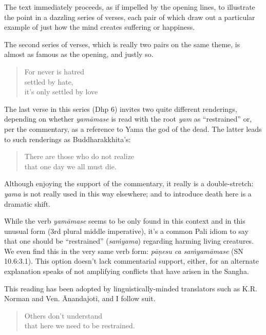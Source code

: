 \documentclass[12pt,openany]{book}%
\begin{document}
The text immediately proceeds, as if impelled by the opening lines, to illustrate the point in a dazzling series of verses, each pair of which draw out a particular example of just how the mind creates suffering or happiness.

The second series of verses, which is really two pairs on the same theme, is almost as famous as the opening, and justly so.

\begin{verse}%
For never is hatred\\

    settled by hate,\\

    it’s only settled by love

%
\end{verse}

The last verse in this series (Dhp 6) invites two quite different renderings, depending on whether \textit{\textsanskrit{yamāmase}} is read with the root \textit{yam} as “restrained” or, per the commentary, as a reference to Yama the god of the dead. The latter leads to such renderings as Buddharakkhita’s:

\begin{verse}%
There are those who do not realize\\

that one day we all must die.

%
\end{verse}

Although enjoying the support of the commentary, it really is a double-stretch: \textit{yama} is not really used in this way elsewhere; and to introduce death here is a dramatic shift.

While the verb \textit{\textsanskrit{yamāmase}}  seems to be only found in this context and in this unusual form (3rd plural middle imperative), it’s a common Pali idiom to say that one should be “restrained” (\textit{\textsanskrit{saṁyama}}) regarding harming living creatures. We even find this in the very same verb form: \textit{\textsanskrit{pāṇesu} ca \textsanskrit{saṁyamāmase}} (SN 10.6:3.1). This option doesn’t lack commentarial support, either, for an alternate explanation speaks of not amplifying conflicts that have arisen in the Sangha.

This reading has been adopted by linguistically-minded translators such as K.R. Norman and Ven. Ānandajoti, and I follow suit.

\begin{verse}%
Others don’t understand\\

    that here we need to be restrained.

%
\end{verse}
\end{document}
